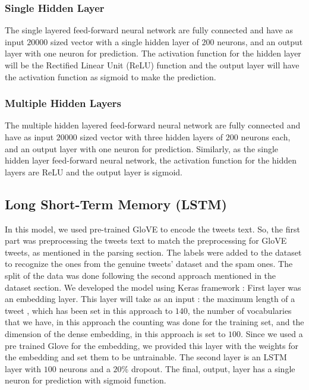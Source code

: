 \subsubsection{Single Hidden Layer} The single layered feed-forward
neural network are fully connected and have as input $20000$ sized
vector with a single hidden layer of $200$ neurons, and an output
layer with one neuron for prediction. The activation function for the
hidden layer will be the Rectified Linear Unit (ReLU) function and the
output layer will have the activation function as sigmoid to make the
prediction.

\subsubsection{Multiple Hidden Layers} The multiple hidden layered
feed-forward neural network are fully connected and have as input
$20000$ sized vector with three hidden layers of $200$ neurons each, and
an output layer with one neuron for prediction. Similarly, as the
single hidden layer feed-forward neural network, the activation
function for the hidden layers are ReLU and the output layer is sigmoid.

\subsection{Long Short-Term Memory (LSTM)}
In this model, we used pre-trained GloVE to encode the tweets text. So, the first part was preprocessing the tweets text to match the preprocessing for GloVE tweets, as mentioned in the parsing section. The labels were added to the dataset to recognize the ones from the genuine tweets’ dataset and the spam ones. The split of the data was done following the second approach mentioned in the dataset section. We developed the model using Keras framework  \citep{chollet2015keras}:
First layer was an embedding layer. This layer will take as an input : the maximum length of a tweet , which has been set in this approach to $140$, the number of vocabularies that we have, in this approach the counting was done for the training set, and the dimension of the dense embedding, in this approach is set to $100$. Since we used a pre trained Glove for the embedding, we provided this layer with the weights for the embedding and set them to be untrainable. 
The second layer is an LSTM layer with $100$ neurons and a $20$\% dropout. 
The final, output, layer has a single neuron for prediction with sigmoid function.


